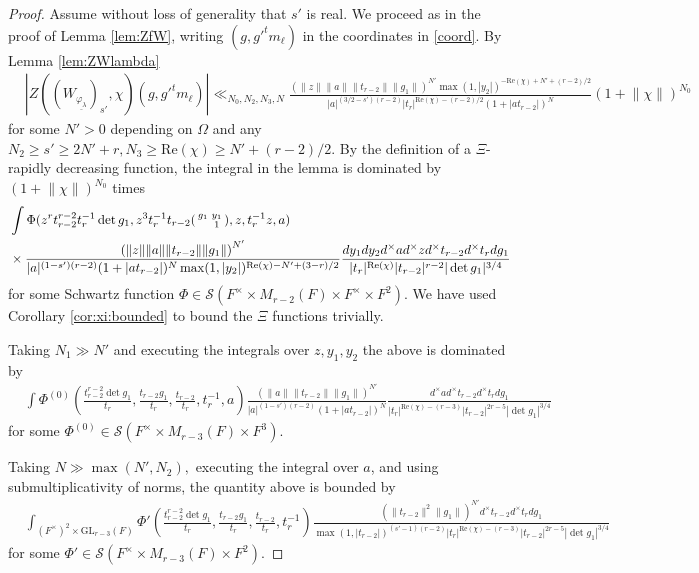 \documentclass[12pt]{amsart}
\theoremstyle{remark}
\numberwithin{equation}{section}
\newcommand{\GL}{\mathrm{GL}}
\theoremstyle{definition}
\newenvironment{psmatrix}
  {\left(\begin{smallmatrix}}
  {\end{smallmatrix}\right)}
\numberwithin{equation}{subsection}
\newcommand{\norm}[1]{\lVert#1\rVert}
\begin{document}
\begin{proof}   
Assume without loss of generality that $s'$ is real. We proceed as in the proof of Lemma \ref{lem:ZfW}, writing $(g,g'^tm_\ell)$ in the coordinates in \eqref{coord}.
 By Lemma \ref{lem:ZWlambda} 
\begin{align*}
    &|Z((W_{\underline{\varphi_{\lambda}}})_{s'},\chi)(g,g'^tm_{\ell})|\ll_{N_0,N_2,N_3,N} \frac{\left(\norm{z}\norm{a}\norm{t_{r-2}}\norm{g_1}\right)^{N'}\max(1,|y_2|)^{-\mathrm{Re}(\chi)+N'+(r-2)/2}}{|a|^{(3/2-s')(r-2)}|t_r|^{\mathrm{Re}(\chi)-(r-2)/2}(1+|at_{r-2}|)^N}(1+\norm{\chi})^{N_0}
\end{align*}
for some $N'>0$ depending on $\Omega$ and any $N_2\ge s'\ge 2N'+r, N_3\ge \mathrm{Re}(\chi)\ge N'+(r-2)/2.$  By the definition of a $\Xi$-rapidly decreasing function, the integral in the lemma is dominated by $(1+\norm{\chi})^{N_0}$ times
\begin{align*}
    &\int \Phi(z^rt_{r-2}^{r-2}t_r^{-1}\det g_1, z^3t_{r}^{-1}t_{r-2}\begin{psmatrix} g_1 & y_1\\ & 1\end{psmatrix},z,t_{r}^{-1}z,a)\\
    &\times \frac{\left(\norm{z}\norm{a}\norm{t_{r-2}}\norm{g_1}\right)^{N'}}{|a|^{(1-s')(r-2)}(1+|at_{r-2}|)^N\max(1,|y_2|)^{\mathrm{Re}(\chi)-N'+(3-r)/2}} \frac{ dy_1dy_2 d^\times a d^\times z d^\times t_{r-2} d^\times t_{r}dg_1}{|t_r|^{\mathrm{Re}(\chi)}|t_{r-2}|^{r-2}|\det g_1|^{3/4}}
\end{align*}
for some Schwartz function $\Phi \in \mathcal{S}(F^\times \times M_{r-2}(F)\times F^\times \times F^2)$. We have used Corollary \ref{cor:xi:bounded} to bound the $\Xi$ functions trivially.


Taking $N_1 \gg N'$ and executing the integrals over $z,y_1,y_2$ the above is dominated by 
 \begin{align*}
    &\int \Phi^{(0)}\left(\frac{t_{r-2}^{r-2}\det g_1}{t_r}, 
    \frac{t_{r-2}g_1}{t_r},\frac{t_{r-2}}{t_r},t_r^{-1},a\right)\frac{\left(\norm{a}\norm{t_{r-2}}\norm{g_1}\right)^{N'}}{|a|^{(1-s')(r-2)}(1+|at_{r-2}|)^N} \frac{d^\times a  d^\times t_{r-2} d^\times t_{r}dg_1}{|t_r|^{\mathrm{Re}(\chi)-(r-3)}|t_{r-2}|^{2r-5}|\det g_1|^{3/4}}
\end{align*}
for some $\Phi^{(0)} \in \mathcal{S}(F^\times \times M_{r-3}(F) \times F^3).$


Taking $N \gg \max(N',N_2),$ executing the integral over $a$, and using submultiplicativity of norms,  the quantity above is bounded by 
\begin{align*}
    &\int_{(F^\times)^2 \times \GL_{r-3}(F)}\Phi'\left(\frac{t_{r-2}^{r-2}\det g_1}{t_r}, \frac{t_{r-2} g_1}{t_r}, \frac{t_{r-2}}{t_r} ,t_r^{-1}\right) \frac{(\norm{t_{r-2}}^2\norm{g_1})^{N'} d^\times t_{r-2} d^\times t_{r}dg_1}{\max(1,|t_{r-2}|)^{(s'-1)(r-2)}|t_r|^{\mathrm{Re}(\chi)-(r-3)}|t_{r-2}|^{2r-5}|\det g_1|^{3/4}}
\end{align*}
for some $\Phi' \in \mathcal{S}(F^\times \times M_{r-3}(F) \times F^2).$ 


\end{proof}
\end{document}

